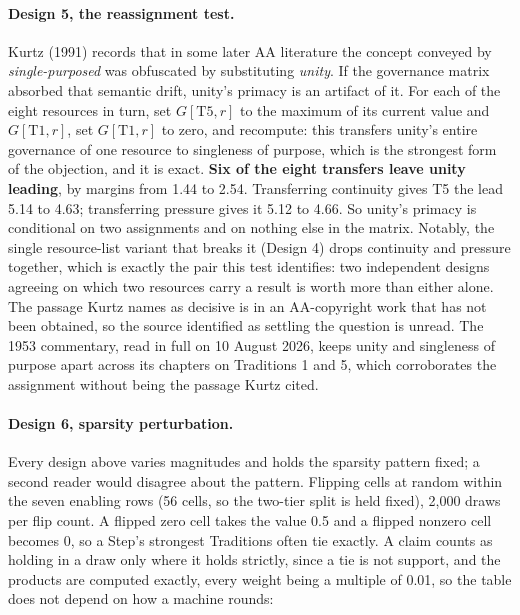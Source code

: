 \documentclass[11pt,a4paper]{article}
\begin{document}
\paragraph{Design 5, the reassignment test.} Kurtz (1991) records that in some later AA
literature the concept conveyed by \emph{single-purposed} was obfuscated by
substituting \emph{unity}. If the governance matrix absorbed that semantic drift,
unity's primacy is an artifact of it. For each of the eight resources in turn, set
$G[\text{T5},r]$ to the maximum of its current value and $G[\text{T1},r]$, set
$G[\text{T1},r]$ to zero, and recompute: this transfers unity's entire governance
of one resource to singleness of purpose, which is the strongest form of the
objection, and it is exact. \textbf{Six of the eight transfers leave unity
leading}, by margins from 1.44 to 2.54. Transferring continuity gives T5 the lead
5.14 to 4.63; transferring pressure gives it 5.12 to 4.66. So unity's primacy is
conditional on two assignments and on nothing else in the matrix. Notably, the
single resource-list variant that breaks it (Design 4) drops continuity and
pressure together, which is exactly the pair this test identifies: two independent
designs agreeing on which two resources carry a result is worth more than either
alone. The passage Kurtz names as decisive is in an AA-copyright work that has not
been obtained, so the source identified as settling the question is unread.
The 1953 commentary, read in full on 10 August 2026, keeps unity and singleness
of purpose apart across its chapters on Traditions 1 and 5, which corroborates
the assignment without being the passage Kurtz cited.

\paragraph{Design 6, sparsity perturbation.} Every design above varies magnitudes
and holds the sparsity pattern fixed; a second reader would disagree about the
pattern. Flipping cells at random within the seven enabling rows (56 cells, so the
two-tier split is held fixed), 2,000 draws per flip count. A flipped zero cell takes the value
0.5 and a flipped nonzero cell becomes 0, so a Step's strongest Traditions often tie exactly. A claim counts as holding
in a draw only where it holds strictly, since a tie is not support, and the products
are computed exactly, every weight being a multiple of 0.01, so the table does not
depend on how a machine rounds:
\end{document}
